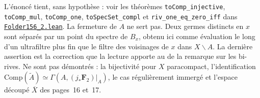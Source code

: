 \noindent L'énoncé tient, sans hypothèse : voir les théorèmes \texttt{toComp\_injective}, \texttt{toComp\_mul}, \texttt{toComp\_one}, \texttt{toSpecSet\_compl} et \texttt{riv\_one\_eq\_zero\_iff} dans \href{\leanblob/Order/Folder156_2.lean}{\texttt{Folder156\_2.\allowbreak{}lean}}. La fermeture de $A$ ne sert pas. Deux germes distincts en $x$ sont séparés par un point du spectre de $B_x$, obtenu ici comme évaluation le long d'un ultrafiltre plus fin que le filtre des voisinages de $x$ dans $X \smallsetminus A$. La dernière assertion est la correction  que la lecture apporte au  de la remarque sur les bi-rives. Ne sont pas démontrés : la bijectivité pour $X$ paracompact, l'identification $\mathrm{Comp}(\widetilde A) \simeq \Gamma(A, (j_*\mathbf F_2)|_A)$, le cas régulièrement immergé et l'espace découpé $\overline X$ des pages~16 et~17.
